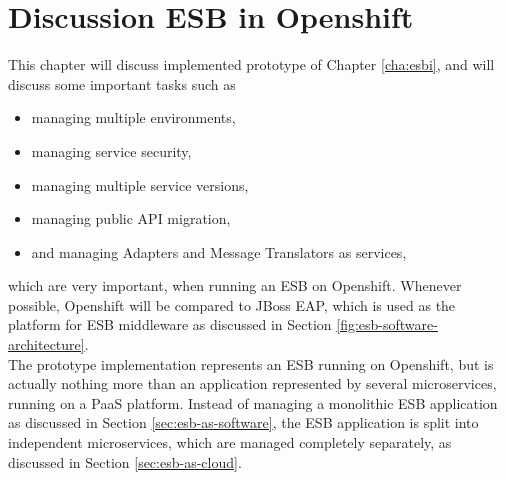 \chapter{Discussion ESB in Openshift}
\label{cha:esbd}
This chapter will discuss implemented prototype of Chapter \vref{cha:esbi}, and will discuss some important tasks such as 
\begin{itemize}
	\item managing multiple environments,
	\item managing service security,
	\item managing multiple service versions,
	\item managing public API migration,
	\item and managing Adapters and Message Translators as services,
\end{itemize}
which are very important, when running an ESB on Openshift. Whenever possible, Openshift will be compared to JBoss EAP, which is used as the platform for ESB middleware as discussed in Section \vref{fig:esb-software-architecture}. \\

The prototype implementation represents an ESB running on Openshift, but is actually nothing more than an application represented by several microservices, running on a PaaS platform. Instead of managing a monolithic ESB application as discussed in Section \vref{sec:esb-as-software}, the ESB application is split into independent microservices, which are managed completely separately, as discussed in Section \vref{sec:esb-as-cloud}. \\

